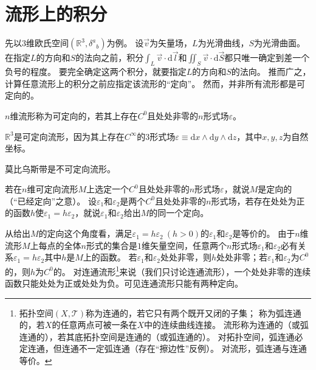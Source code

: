 \section{流形上的积分}

先以$3$维欧氏空间$(\mathbb{R}^3, \delta^a{}_{b})$为例。
设$\vec{v}$为矢量场，$L$为光滑曲线，$S$为光滑曲面。
在指定$L$的方向和$S$的法向之前，积分$\displaystyle\int_L\vec{v}\cdot\mathrm{d}\vec{l}$和$\displaystyle\iint_S\vec{v}\cdot\mathrm{d}\vec{S}$都只唯一确定到差一个负号的程度。
要完全确定这两个积分，就要指定$L$的方向和$S$的法向。
推而广之，计算任意流形上的积分之前应指定该流形的``定向''。
然而，并非所有流形都是可定向的。

\begin{definition}
    $n$维流形称为可定向的，若其上存在$C^0$且处处非零的$n$形式场$\varepsilon$。
\end{definition}

\begin{example}
    $\mathbb{R}^3$是可定向流形，因为其上存在$C^\infty$的$3$形式场$\varepsilon \equiv \mathrm{d}x \wedge \mathrm{d}y \wedge \mathrm{d}z$，其中$x, y, z$为自然坐标。
\end{example}

\begin{example}
    莫比乌斯带是不可定向流形。
\end{example}

\begin{definition}
    若在$n$维可定向流形$M$上选定一个$C^0$且处处非零的$n$形式场$\varepsilon$，就说$M$是定向的（``已经定向''之意）。
    设$\varepsilon_1$和$\varepsilon_2$是两个$C^0$且处处非零的$n$形式场，若存在处处为正的函数$h$使$\varepsilon_1 = h\varepsilon_2$，就说$\varepsilon_1$和$\varepsilon_2$给出$M$的同一个定向。
\end{definition}

\begin{note}
    从给出$M$的定向这个角度看，满足$\varepsilon_1 = h\varepsilon_2 ~ (h > 0)$的$\varepsilon_1$和$\varepsilon_2$是等价的。
    由于$n$维流形$M$上每点的全体$n$形式的集合是$1$维矢量空间，任意两个$n$形式场$\varepsilon_1$和$\varepsilon_2$必有关系$\varepsilon_1 = h\varepsilon_2$其中$h$是$M$上的函数。
    若$\varepsilon_1$和$\varepsilon_2$处处非零，则$h$处处非零；若$\varepsilon_1$和$\varepsilon_2$为$C^0$的，则$h$为$C^0$的。
    对连通流形\footnote{
        拓扑空间$(X, \mathscr{T})$称为连通的，若它只有两个既开又闭的子集；
        称为弧连通的，若$X$的任意两点可被一条在$X$中的连续曲线连接。
        流形称为连通的（或弧连通的），若其底拓扑空间是连通的（或弧连通的）。
        对拓扑空间，弧连通必定连通，但连通不一定弧连通（存在``擦边性''反例）。
        对流形，弧连通与连通等价。
    }来说（我们只讨论连通流形），一个处处非零的连续函数只能处处为正或处处为负。可见连通流形只能有两种定向。
\end{note}

